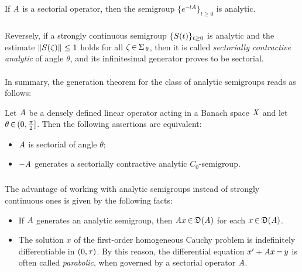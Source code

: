\documentclass[11pt,twoside]{article}
\begin{document}
\begin{theorem1}\label{SEMIGROUP_CREATED_BY_SECTORIAL_OPERATOR_IS_ANALYTIC}
If $\mathit{A}$ is a sectorial operator,
then the semigroup $\{e^{-tA}\}_{t \geq 0}$ is {analytic}.
\end{theorem1}

\subparagraph{} %
Reversely,
if a strongly continuous semigroup $\{{S}(t)\}_{t \geq 0}$
is analytic and the estimate $\left\lVert {S}(\zeta) \right\rVert \leq 1$ holds
for all $\zeta {\,\in\,} \Sigma_{\,\theta}$,
then it is called \textit{sectorially contractive analytic} of angle $\theta$,
and its infinitesimal generator proves to be sectorial.

\paragraph{} %
In summary,
the generation theorem for the class of analytic semigroups reads as follows:

\begin{theorem1}\label{CRITERION_FOR_SEMIGROUP_TO_BE_SECTORIALLY_CONTRACTIVE}
Let $\mathit{A}$ be a densely defined linear operator
acting in a Banach space $\mathit{X}$
and let $\theta {\,\in\,} (0,\frac{\pi}{2}]$.
Then the following assertions are equivalent:

\begin{itemize}[leftmargin=9mm]
\item[(a)]
$\mathit{A}$ is sectorial of angle $\theta$;
\item[(b)]
${-}\mathit{A}$ generates a sectorially contractive analytic $C_0$-semigroup.
\end{itemize}
\end{theorem1}

\subparagraph{} %
The advantage of working with analytic semigroups
instead of strongly continuous ones is given by the following facts:

\begin{itemize}[leftmargin=4mm]
\item[1.]
If $\mathit{A}$ generates an analytic semigroup,
then $\mathit{A} x {\,\in\,} \mathfrak{D}(\mathit{A})$ for each $x {\,\in\,} \mathfrak{D}(\mathit{A})$.

\item[2.]
The solution $x$ of the first-order homogeneous Cauchy problem is indefinitely
differentiable in $(0,\tau)$.
By this reason,
the differential equation $x' + \mathit{A} x {\,=\,} y$
is often called \textit{parabolic},
when governed by a sectorial operator $\mathit{A}$.
\end{itemize}
\end{document}
